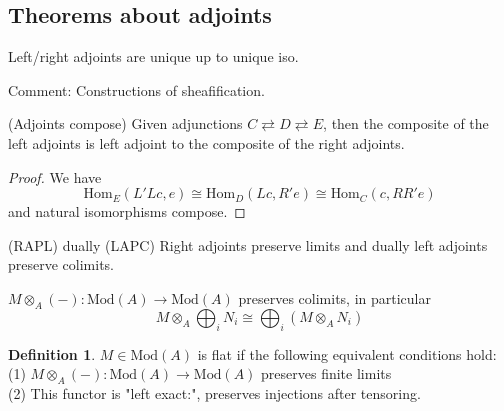 \documentclass{article}
\theoremstyle{definition}
\theoremstyle{definition}
\newtheorem{definition}{Definition}[section]
\theoremstyle{remark}
\begin{document}
\subsection{Theorems about adjoints}

\begin{theo}{}{}
	Left/right adjoints are unique up to unique iso.
\end{theo}
Comment: Constructions of sheafification.

\begin{theo}{(Adjoints compose)}{}
	Given adjunctions $C \rightleftarrows D \rightleftarrows E$, then the composite of the left adjoints is left adjoint to the composite of the right adjoints.
\end{theo}
\begin{proof}
	We have 
	\[\text{Hom}_E(L'Lc, e) \cong \text{Hom}_D(Lc, R'e) \cong \text{Hom}_C(c, RR'e)\]
	and natural isomorphisms compose.
\end{proof}

\begin{theo}{(RAPL) dually (LAPC)}{}
Right adjoints preserve limits and dually left adjoints preserve colimits.	
\end{theo}

\begin{coroll}{}{}
	$M \otimes_A (-): \text{Mod}(A) \to \text{Mod}(A)$ preserves colimits, in particular
	\[M \otimes_A \bigoplus_i N_i \cong \bigoplus_i (M \otimes_A N_i)\]
\end{coroll}

\begin{definition}
	$M \in \text{Mod}(A)$ is flat if the following equivalent conditions hold:\\
	\indent (1) $M \otimes_A (-): \text{Mod}(A) \to \text{Mod}(A)$ preserves finite limits\\
	\indent (2) This functor is "left exact:", preserves injections after tensoring.
\end{definition}
\end{document}
